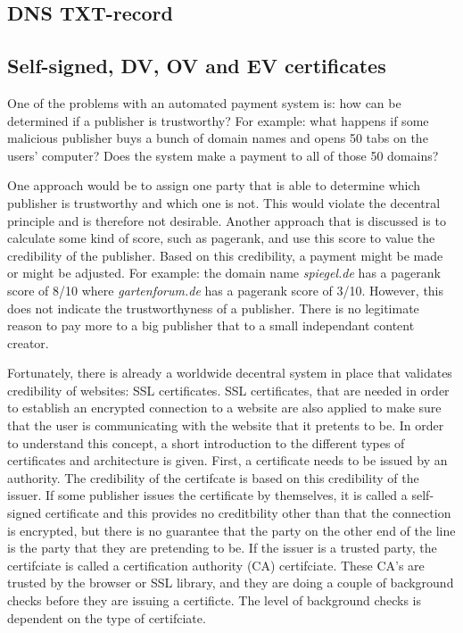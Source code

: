 \subsection{DNS TXT-record}

\subsection{Self-signed, DV, OV and EV certificates}

One of the problems with an automated payment system is: how can be determined if a publisher is trustworthy? For example: what happens if some malicious publisher buys a bunch of domain names and opens 50 tabs on the users' computer? Does the system make a payment to all of those 50 domains? 

One approach would be to assign one party that is able to determine which publisher is trustworthy and which one is not. This would violate the decentral principle and is therefore not desirable. Another approach that is discussed is to calculate some kind of score, such as pagerank, and use this score to value the credibility of the publisher. Based on this credibility, a payment might be made or might be adjusted. For example: the domain name \textit{spiegel.de} has a pagerank score of 8/10 where \textit{gartenforum.de} has a pagerank score of 3/10. However, this does not indicate the trustworthyness of a publisher. There is no legitimate reason to pay more to a big publisher that to a small independant content creator. 

Fortunately, there is already a worldwide decentral system in place that validates credibility of websites: SSL certificates. SSL certificates, that are needed in order to establish an encrypted connection to a website are also applied to make sure that the user is communicating with the website that it pretents to be. In order to understand this concept, a short introduction to the different types of certificates and architecture is given. First, a certificate needs to be issued by an authority. The credibility of the certifcate is based on this credibility of the issuer. If some publisher issues the certificate by themselves, it is called a self-signed certificate and this provides no creditbility other than that the connection is encrypted, but there is no guarantee that the party on the other end of the line is the party that they are pretending to be. If the issuer is a trusted party, the certifciate is called a certification authority (CA) certifciate. These CA's are trusted by the browser or SSL library, and they are doing a couple of background checks before they are issuing a certificte. The level of background checks is dependent on the type of certifciate. 

